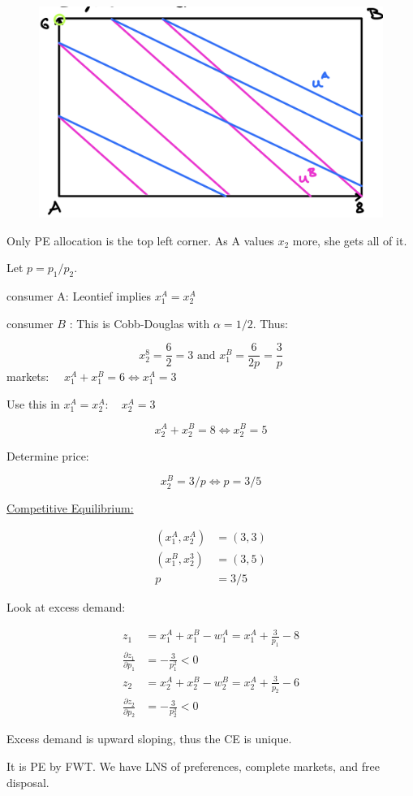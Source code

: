 {\begin{enumerate}[label=(\alph*)]
{\begin{figure}[!htp]
    \centering
    \includegraphics[width=.75\textwidth]{images/2016_17_1_2.png}
\end{figure}

Only PE allocation is the top left corner. As A values $x_{2}$ more, she gets all of it.
}
{\item 
Let $p=p_{1} / p_{2}$.

consumer A: Leontief implies $x_{1}^{A}=x_{2}^{A}$

consumer $B$ : This is Cobb-Douglas with $\alpha=1 / 2$. Thus:

$$
x_{2}^{8}=\frac{6}{2}=3 \text { and } x_{1}^{B}=\frac{6}{2 p}=\frac{3}{p}
$$
markets: $\quad x_{1}^{A}+x_{1}^{B}=6 \Leftrightarrow x_{1}^{A}=3$

Use this in $x_{1}^{A}=x_{2}^{A}: \quad x_{2}^{A}=3$

$$
x_{2}^{A}+x_{2}^{B}=8 \Longleftrightarrow x_{2}^{B}=5
$$

Determine price:

$$
x_{2}^{B}=3 / p \Leftrightarrow p=3 / 5
$$

\underline{Competitive Equilibrium:}

$$
\begin{aligned}
\left(x_{1}^{A}, x_{2}^{A}\right) & =(3,3) \\
\left(x_{1}^{B}, x_{2}^{3}\right) & =(3,5) \\
p & =3 / 5
\end{aligned}
$$
}
{\item 
Look at excess demand:

$$
\begin{aligned}
z_{1} & =x_{1}^{A}+x_{1}^{B}-w_{1}^{A}=x_{1}^{A}+\frac{3}{p_{1}}-8 \\
\frac{\partial z_{1}}{\partial p_{1}} & =-\frac{3}{p_{1}^{2}}<0 \\
z_{2} & =x_{2}^{A}+x_{2}^{B}-w_{2}^{B}=x_{2}^{A}+\frac{3}{p_{2}}-6 \\
\frac{\partial z_{2}}{\partial p_{2}} & =-\frac{3}{p_{2}^{2}}<0
\end{aligned}
$$

Excess demand is upward sloping, thus the CE is unique.

It is PE by FWT. We have LNS of preferences, complete markets, and free disposal.
}
\end{enumerate}
}
